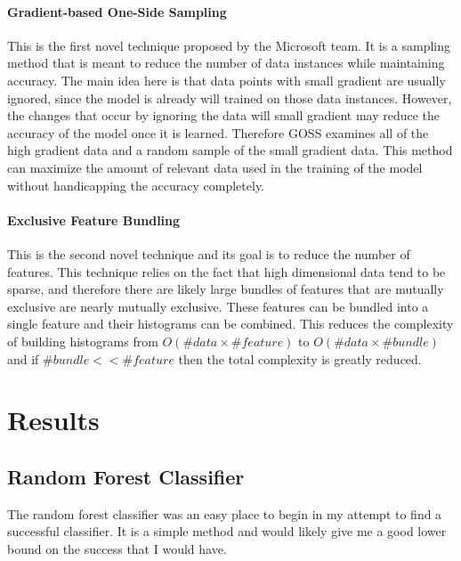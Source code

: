 \documentclass[11pt]{article}
\begin{document}
\hypertarget{gradient-based-one-side-sampling}{%
\paragraph{Gradient-based One-Side
Sampling}\label{gradient-based-one-side-sampling}}

This is the first novel technique proposed by the Microsoft team. It is
a sampling method that is meant to reduce the number of data instances
while maintaining accuracy. The main idea here is that data points with
small gradient are usually ignored, since the model is already will
trained on those data instances. However, the changes that occur by
ignoring the data will small gradient may reduce the accuracy of the
model once it is learned. Therefore GOSS examines all of the high
gradient data and a random sample of the small gradient data. This
method can maximize the amount of relevant data used in the training of
the model without handicapping the accuracy completely.

\hypertarget{exclusive-feature-bundling}{%
\paragraph{Exclusive Feature
Bundling}\label{exclusive-feature-bundling}}

This is the second novel technique and its goal is to reduce the number
of features. This technique relies on the fact that high dimensional
data tend to be sparse, and therefore there are likely large bundles of
features that are mutually exclusive are nearly mutually exclusive.
These features can be bundled into a single feature and their histograms
can be combined. This reduces the complexity of building histograms from
$O(\#data \times \#feature)$ to $O(\#data \times \#bundle)$ and if
$\#bundle << \#feature$ then the total complexity is greatly reduced.

    \hypertarget{results}{%
\section{Results}\label{results}}

\hypertarget{random-forest-classifier}{%
\subsection{Random Forest Classifier}\label{random-forest-classifier}}

The random forest classifier was an easy place to begin in my attempt to
find a successful classifier. It is a simple method and would likely
give me a good lower bound on the success that I would have.
\end{document}
